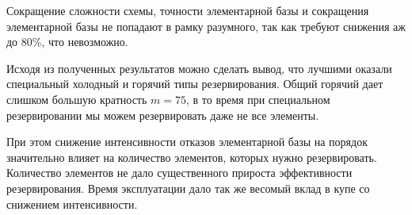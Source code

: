 \Conclusion
Сокращение сложности схемы, точности элементарной базы и сокращения элементарной базы не попадают в рамку разумного, так как требуют снижения аж до 80\%, что невозможно.

Исходя из полученных результатов можно сделать вывод, что лучшими оказали специальный холодный и горячий типы резервирования. Общий горячий дает слишком большую кратность $ m =75 $, в то время при специальном резервировании  мы можем резервировать даже не все элементы.

При этом снижение интенсивности отказов элементарной базы на порядок значительно влияет на количество элементов, которых нужно резервировать. Количество элементов не дало существенного прироста эффективности резервирования. Время эксплуатации дало так же весомый вклад в купе со снижением интенсивности.